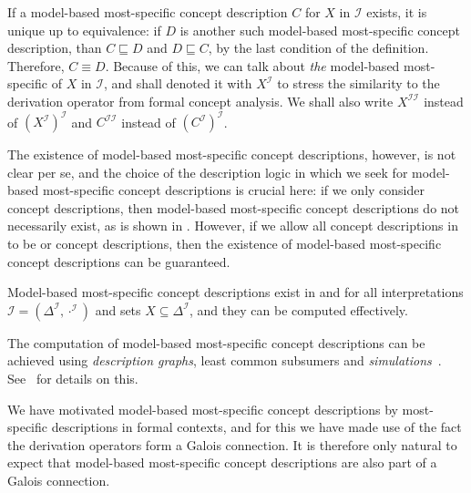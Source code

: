 If a model-based most-specific concept description $C$ for $X$ in $\mathcal{I}$ exists, it
is unique up to equivalence: if $D$ is another such model-based most-specific concept
description, than $C \sqsubseteq D$ and $D \sqsubseteq C$, by the last condition of the
definition.  Therefore, $C \equiv D$.  Because of this, we can talk about \emph{the}
model-based most-specific of $X$ in $\mathcal{I}$, and shall denoted it with
$X^{\mathcal{I}}$ to stress the similarity to the derivation operator from formal concept
analysis.  We shall also write $X^{\mathcal{I}\mathcal{I}}$ instead of
$(X^{\mathcal{I}})^{\mathcal{I}}$ and $C^{\mathcal{I}\mathcal{I}}$ instead of
$(C^{\mathcal{I}})^{\mathcal{I}}$.

The existence of model-based most-specific concept descriptions, however, is not clear per
se, and the choice of the description logic in which we seek for model-based most-specific
concept descriptions is crucial here: if we only consider \ELbot concept descriptions,
then model-based most-specific concept descriptions do not necessarily exist, as is shown
in .  However, if we allow all concept
descriptions in  to be \ELgfp or \ELgfpbot
concept descriptions, then the existence of model-based most-specific concept descriptions
can be guaranteed.

\begin{Theorem}
  \label{thm:existence-of-mmscs-in-ELgfpbot}
  Model-based most-specific concept descriptions exist in \ELgfp and \ELgfpbot for all
  interpretations $\mathcal{I} = (\Delta^{\mathcal{I}}, \cdot^{\mathcal{I}})$ and sets $X
  \subseteq \Delta^{\mathcal{I}}$, and they can be computed effectively.
\end{Theorem}

The computation of model-based most-specific concept descriptions can be achieved using
\emph{\EL description graphs}, least common subsumers and
\emph{simulations}~\cite{DBLP:conf/ijcai/Baader03a,Diss-Felix}.  See~\cite[Section
4.1.2]{Diss-Felix} for details on this.

We have motivated model-based most-specific concept descriptions by most-specific
descriptions in formal contexts, and for this we have made use of the fact the derivation
operators form a Galois connection.  It is therefore only natural to expect that
model-based most-specific concept descriptions are also part of a Galois connection.

